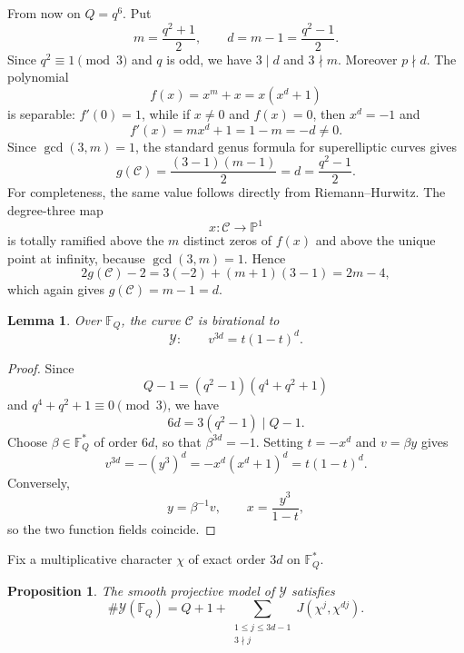 \documentclass[3p,10pt]{elsarticle}
\newtheorem{proposition}[theorem]{Proposition}
\newtheorem{lemma}[theorem]{Lemma}
\theoremstyle{remark}
\newcommand{\cC}{\mathcal{C}}
\newcommand{\cY}{\mathcal{Y}}
\newcommand{\F}{\mathbb{F}}
\begin{document}
From now on $Q=q^6$. Put
\[
m=\frac{q^2+1}{2},
\qquad
d=m-1=\frac{q^2-1}{2}.
\]
Since $q^2\equiv 1\pmod 3$ and $q$ is odd, we have $3\mid d$ and $3\nmid m$. Moreover $p\nmid d$. The polynomial
\[
f(x)=x^m+x=x(x^d+1)
\]
is separable: $f'(0)=1$, while if $x\ne 0$ and $f(x)=0$, then $x^d=-1$ and
\[
f'(x)=mx^d+1=1-m=-d\ne 0.
\]
Since $\gcd(3,m)=1$, the standard genus formula for superelliptic curves \cite[Proposition~6.3.1]{Stichtenoth} gives
\begin{equation}\label{eq:genus}
g(\cC)=\frac{(3-1)(m-1)}{2}=d=\frac{q^2-1}{2}.
\end{equation}
For completeness, the same value follows directly from Riemann--Hurwitz. The degree-three map
\[
x:\cC\longrightarrow \mathbb P^1
\]
is totally ramified above the $m$ distinct zeros of $f(x)$ and above the unique point at infinity, because $\gcd(3,m)=1$. Hence
\[
2g(\cC)-2=3(-2)+(m+1)(3-1)=2m-4,
\]
which again gives $g(\cC)=m-1=d$.

\begin{lemma}\label{lem:birat}
Over $\F_Q$, the curve $\cC$ is birational to
\[
\cY:\qquad v^{3d}=t(1-t)^d.
\]
\end{lemma}

\begin{proof}
Since
\[
Q-1=(q^2-1)(q^4+q^2+1)
\]
and $q^4+q^2+1\equiv 0\pmod 3$, we have
\[
6d=3(q^2-1)\mid Q-1.
\]
Choose $\beta\in\F_Q^*$ of order $6d$, so that $\beta^{3d}=-1$. Setting $t=-x^d$ and $v=\beta y$ gives
\[
v^{3d}=-(y^3)^d=-x^d(x^d+1)^d=t(1-t)^d.
\]
Conversely,
\[
y=\beta^{-1}v,
\qquad
x=\frac{y^3}{1-t},
\]
so the two function fields coincide.
\end{proof}

Fix a multiplicative character $\chi$ of exact order $3d$ on $\F_Q^*$.

\begin{proposition}\label{prop:count}
The smooth projective model of $\cY$ satisfies
\begin{equation}\label{eq:pointcount}
\#\cY(\F_Q)=Q+1+
\sum_{\substack{1\le j\le 3d-1\\3\nmid j}}
J(\chi^j,\chi^{dj}).
\end{equation}
\end{proposition}
\end{document}
